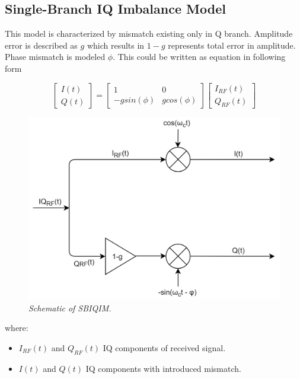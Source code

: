 \documentclass[en,printmode]{mgr}
\begin{document}
		\subsection*{Single-Branch IQ Imbalance Model}
			This model is characterized by mismatch existing only in Q branch. Amplitude error is
			described as $g$ which results in $1-g$ represents total error in amplitude. Phase mismatch
			is modeled $\phi$. This could be written as equation in following form \cite{iq_model}
			
		\begin{equation}
			\begin{bmatrix}
				I(t) \\
				Q(t)
			\end{bmatrix}
			=
			\begin{bmatrix}
				1 & 0 \\
				-g sin(\phi) & g cos(\phi)
			\end{bmatrix}
			\begin{bmatrix}
				I_{RF}(t) \\
				Q_{RF}(t)
			\end{bmatrix} \label{eq:SBIQIM}
		\end{equation}
		
		\begin{figure}[!htb]
    		\centering
   			\includegraphics[width=\textwidth]{diag/sbiq.png}
    		\caption{\textit{Schematic of SBIQIM.}}
		\end{figure}
		
		where:
		\begin{itemize}
			\item $I_{RF}(t)$ and $Q_{RF}(t)$ IQ components of received signal.
			\item $I(t)$ and $Q(t)$ IQ components with introduced mismatch.
		\end{itemize}
\end{document}
